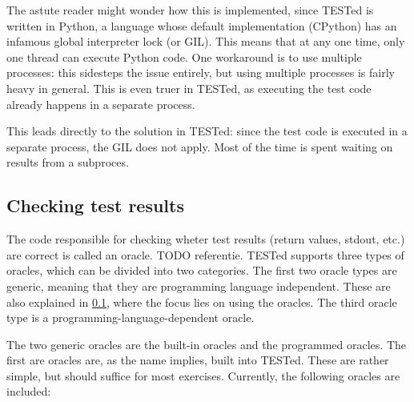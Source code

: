 \documentclass[../main]{subfiles}
\begin{document}
The astute reader might wonder how this is implemented, since TESTed is written in Python, a language whose default implementation (CPython) has an infamous global interpreter lock (or GIL).
This means that at any one time, only one thread can execute Python code.
One workaround is to use multiple processes: this sidesteps the issue entirely, but using multiple processes is fairly heavy in general.
This is even truer in TESTed, as executing the test code already happens in a separate process.

This leads directly to the solution in TESTed: since the test code is executed in a separate process, the GIL does not apply.
Most of the time is spent waiting on results from a subproces.

\subsection{Checking test results}\label{subsec:checking-results}

The code responsible for checking wheter test results (return values, stdout, etc.) are correct is called an oracle. TODO referentie.
TESTed supports three types of oracles, which can be divided into two categories.
The first two oracle types are generic, meaning that they are programming language independent.
These are also explained in \cref{subsec:checking-results}, where the focus lies on using the oracles.
The third oracle type is a programming-language-dependent oracle.

The two generic oracles are the built-in oracles and the programmed oracles.
The first are oracles are, as the name implies, built into TESTed.
These are rather simple, but should suffice for most exercises.
Currently, the following oracles are included:
\end{document}
